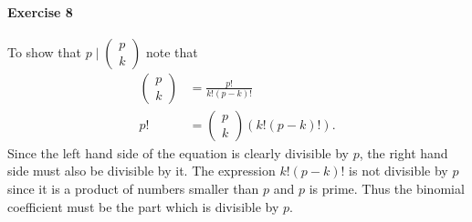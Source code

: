 \documentclass{article}
\begin{document}
\pagebreak
\paragraph{Exercise 8}

To show that $p \mid \left(\begin{smallmatrix}
    p \\k
\end{smallmatrix}\right)$ note that
\begin{align*}
    \begin{pmatrix*}
        p \\k
    \end{pmatrix*} &= \frac{p!}{k!(p - k)!} \\
    p! &= \begin{pmatrix*}
        p \\k
    \end{pmatrix*}(k!(p - k)!).
\end{align*}
Since the left hand side of the equation is clearly divisible by $p$, the right hand side must also be divisible by it. The expression $k!(p - k)!$ is not divisible by $p$ since it is a product of numbers smaller than $p$ and $p$ is prime. Thus the binomial coefficient must be the part which is divisible by $p$.
\end{document}
